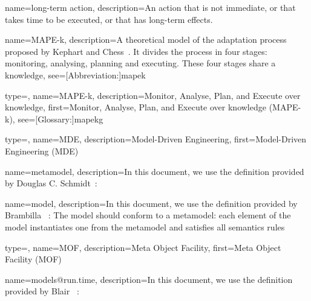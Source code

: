 {
	name={long-term action},
	description={An \gls{action} that is not immediate, or that takes time to be executed, or that has long-term effects.}
}

{
	name={MAPE-k},
    description={A theoretical model of the adaptation process proposed by Kephart and Chess~\cite{DBLP:journals/computer/KephartC03}. It divides the process in four stages: monitoring, analysing, planning and executing. These four stages share a \gls{knowledge}},
    see=[Abbreviation:]{mapek}
}

{
	type=\acronymtype, 
	name={MAPE-k}, 
	description={Monitor, Analyse, Plan, and Execute over knowledge}, 
	first={Monitor, Analyse, Plan, and Execute over knowledge (MAPE-k)}, 
	see=[Glossary:]{mapekg}
}

{
	type=\acronymtype, 
	name={MDE},
	description={Model-Driven Engineering},
	first={Model-Driven Engineering (MDE)}
}

{
	name={meta\-model},
	description={In this document, we use the definition provided by Douglas C. \linebreak Schmidt~\cite{DBLP:journals/computer/Schmidt06}: }
}

{
	name={model},
	description={In this document, we use the definition provided by Brambilla \etal~\cite{DBLP:series/synthesis/2017Brambilla}:  The model should conform to a \gls{metamodel}: each element of the model instantiates one from the \gls{metamodel} and satisfies all semantics rules~\cite{DBLP:conf/iceccs/BezivinJT05}}
}

{
	type=\acronymtype, 
	name={MOF},
	description={Meta Object Facility},
	first={Meta Object Facility (MOF)}
}

{
	name={models@run.time},
	description={In this document, we use the definition provided by Blair \etal~\cite{DBLP:journals/computer/BlairBF09}: }
}

